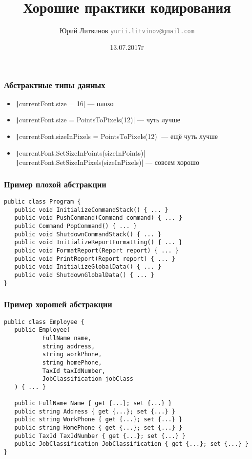 \documentclass[xetex,mathserif,serif]{beamer}
\title{Хорошие практики кодирования}
\author[Юрий Литвинов]{Юрий Литвинов \newline \textcolor{gray}{\small\texttt{yurii.litvinov@gmail.com}}}
\date{13.07.2017г}
\begin{document}
	
	\frame{\titlepage}

	\begin{frame}
		\frametitle{Абстрактные типы данных}
		\begin{itemize}
			\item \texttt|currentFont.size = 16| --- плохо
			\item \texttt|currentFont.size = PointsToPixels(12)| --- чуть лучше
			\item \texttt|currentFont.sizeInPixels = PointsToPixels(12)| --- ещё чуть лучше
			\item \texttt|currentFont.SetSizeInPoints(sizeInPoints)| \newline
					\texttt|currentFont.SetSizeInPixels(sizeInPixels)| --- совсем хорошо
		\end{itemize}
	\end{frame}

	\begin{frame}[fragile]
		\frametitle{Пример плохой абстракции}
		\begin{verbatim}
public class Program {
   public void InitializeCommandStack() { ... }
   public void PushCommand(Command command) { ... }
   public Command PopCommand() { ... }
   public void ShutdownCommandStack() { ... }
   public void InitializeReportFormatting() { ... }
   public void FormatReport(Report report) { ... }
   public void PrintReport(Report report) { ... }
   public void InitializeGlobalData() { ... }
   public void ShutdownGlobalData() { ... }
}
		\end{verbatim}
\end{frame}

	\begin{frame}[fragile]
		\frametitle{Пример хорошей абстракции}
		\begin{footnotesize}
			\begin{verbatim}
public class Employee {
   public Employee(
           FullName name,
           string address,
           string workPhone,
           string homePhone,
           TaxId taxIdNumber,
           JobClassification jobClass
   ) { ... }

   public FullName Name { get {...}; set {...} }
   public string Address { get {...}; set {...} }
   public string WorkPhone { get {...}; set {...} }
   public string HomePhone { get {...}; set {...} }
   public TaxId TaxIdNumber { get {...}; set {...} }
   public JobClassification JobClassification { get {...}; set {...} }
}
			\end{verbatim}
		\end{footnotesize}
\end{frame}
\end{document}
